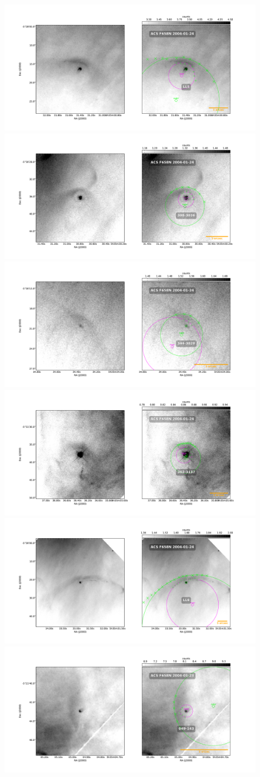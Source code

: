 \documentclass{article}
\begin{document}
\begin{figure}
  \centering
    \includegraphics[width=0.5\linewidth]{j8oc07010_wcs/LL5-Bally_07-images.pdf}
    \includegraphics[width=0.5\linewidth]{j8oc08010_wcs/308-3036-Bally_08-images.pdf}
    \includegraphics[width=0.5\linewidth]{j8oc08010_wcs/344-3020-Bally_08-images.pdf}
    \includegraphics[width=0.5\linewidth]{j8oc08010_wcs/362-3137-Bally_08-images.pdf}
    \includegraphics[width=0.5\linewidth]{j8oc08010_wcs/LL6-Bally_08-images.pdf}
    \includegraphics[width=0.5\linewidth]{j8oc09010_wcs/049-143-Bally_09-images.pdf}
 \label{fig:images}
\end{figure}
\end{document}
